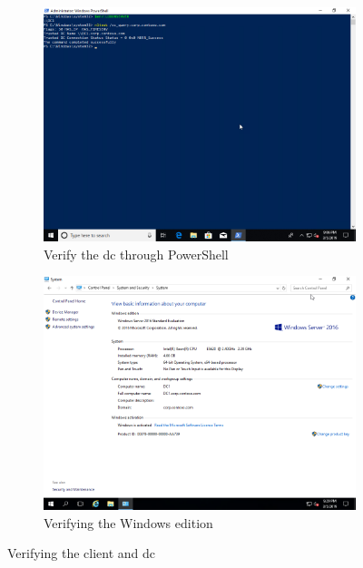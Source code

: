 \begin{figure}[h]\ContinuedFloat
	\begin{subfigure}{0.5\textwidth}
		\captionsetup{width=0.8\linewidth}
		\includegraphics[width=0.9\linewidth]{img/Methodologie/Prerequisites3.png}
		\centering
		\caption{Verify the \acrshort{dc} through PowerShell}
		\label{fig:migration2}
	\end{subfigure}
	\begin{subfigure}{0.5\textwidth}
		\captionsetup{width=0.8\linewidth}
		\includegraphics[width=0.9\linewidth]{img/Methodologie/Prerequisites4.png} 
		\centering	
		\caption{Verifying the Windows edition}
		\label{fig:migration3}
	\end{subfigure}
	\caption{Verifying the client and \acrshort{dc}}
	\label{fig:migration}
\end{figure}
